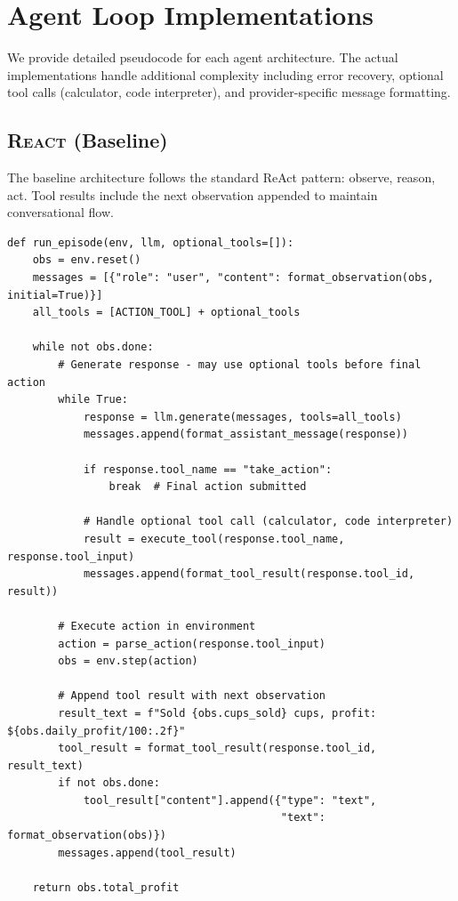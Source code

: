 \section{Agent Loop Implementations}
\label{app:loops}

We provide detailed pseudocode for each agent architecture. The actual implementations handle additional complexity including error recovery, optional tool calls (calculator, code interpreter), and provider-specific message formatting.

\subsection{\textsc{React} (Baseline)}

The baseline architecture follows the standard ReAct pattern: observe, reason, act. Tool results include the next observation appended to maintain conversational flow.

\begin{verbatim}
def run_episode(env, llm, optional_tools=[]):
    obs = env.reset()
    messages = [{"role": "user", "content": format_observation(obs, initial=True)}]
    all_tools = [ACTION_TOOL] + optional_tools
    
    while not obs.done:
        # Generate response - may use optional tools before final action
        while True:
            response = llm.generate(messages, tools=all_tools)
            messages.append(format_assistant_message(response))
            
            if response.tool_name == "take_action":
                break  # Final action submitted
            
            # Handle optional tool call (calculator, code interpreter)
            result = execute_tool(response.tool_name, response.tool_input)
            messages.append(format_tool_result(response.tool_id, result))
        
        # Execute action in environment
        action = parse_action(response.tool_input)
        obs = env.step(action)
        
        # Append tool result with next observation
        result_text = f"Sold {obs.cups_sold} cups, profit: ${obs.daily_profit/100:.2f}"
        tool_result = format_tool_result(response.tool_id, result_text)
        if not obs.done:
            tool_result["content"].append({"type": "text", 
                                           "text": format_observation(obs)})
        messages.append(tool_result)
    
    return obs.total_profit
\end{verbatim}

